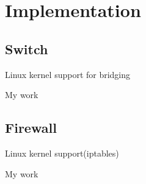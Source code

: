 \chapter{Implementation}
\label{chapter:impl}

\section{Switch}
\label{sub-sec:switch-impl}

Linux kernel support for bridging

My work

\section{Firewall}
\label{sub-sec:firewall-impl}

Linux kernel support(iptables)

My work
